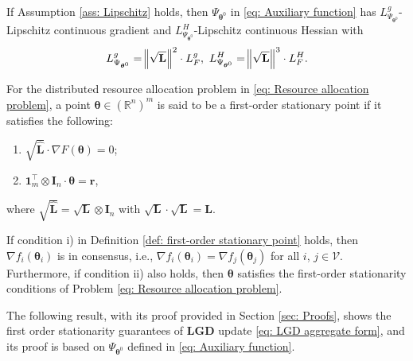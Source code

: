 \documentclass{siamart251216}
\begin{document}
\begin{remark}
    If Assumption \ref{ass: Lipschitz} holds, then $\Psi_{\boldsymbol{\theta}^{0}}$ in \eqref{eq: Auxiliary function} has $L_{\Psi_{\boldsymbol{\theta}^{0}}}^{g}$-Lipschitz continuous gradient and $L_{\Psi_{\boldsymbol{\theta}^{0}}}^{H}$-Lipschitz continuous Hessian with
    \begin{gather}
    \label{eq: Psi Lipschitz}
        L_{\Psi_{\boldsymbol{\theta}^{0}}}^{g} = \norm{\sqrt{\mathbf{L}}}^{2} \cdot L_{F}^{g},~L_{\Psi_{\boldsymbol{\theta}^{0}}}^{H} =  \norm{\sqrt{\mathbf{L}}}^{3} \cdot L_{F}^{H}.
    \end{gather}
\end{remark}

\begin{definition}
\label{def: first-order stationary point}
    For the distributed resource allocation problem in \eqref{eq: Resource allocation problem}, a point $\boldsymbol{\theta} \in (\mathbb{R}^{n})^{m}$ is said to be a first-order stationary point if it satisfies the following:
    \begin{enumerate}
    \renewcommand{\labelenumi}{\roman{enumi})}
        \item $\sqrt{\hat{\mathbf{L}}} \cdot \nabla F(\boldsymbol{\theta}) = 0$;
        \item $\bm{1}_{m}^{\top} \otimes \mathbf{I}_{n} \cdot \boldsymbol{\theta} = \bm{r}$,
    \end{enumerate}
    where $\sqrt{\hat{\mathbf{L}}} = \sqrt{\mathbf{L}}\otimes \mathbf{I}_{n}$ with $\sqrt{\mathbf{L}} \cdot \sqrt{\mathbf{L}} = \mathbf{L}$.
\end{definition}

\begin{remark}
    If condition i) in Definition \ref{def: first-order stationary point} holds, then $\nabla f_{i}(\boldsymbol{\theta}_{i})$ is in consensus, i.e., $\nabla f_{i}(\boldsymbol{\theta}_{i}) = \nabla f_{j}(\boldsymbol{\theta}_{j})$ for all $i$, $j \in \mathcal{V}$. Furthermore, if condition ii) also holds, then $\boldsymbol{\theta}$ satisfies the first-order stationarity conditions of Problem \eqref{eq: Resource allocation problem}.
\end{remark}
 
The following result, with its proof provided in Section \ref{sec: Proofs}, shows the first order stationarity guarantees of \textbf{LGD} update \eqref{eq: LGD aggregate form}, and its proof is based on $\Psi_{\boldsymbol{\theta}^{0}}$ defined in \eqref{eq: Auxiliary function}.
\end{document}
